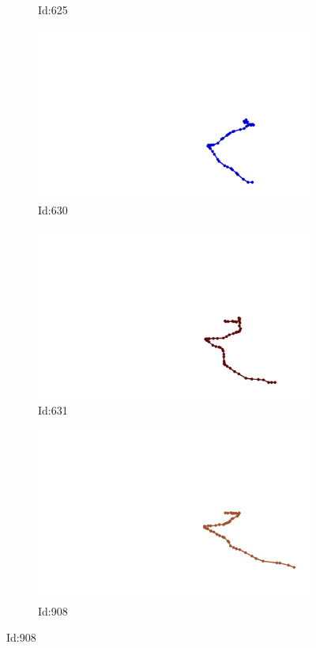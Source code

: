\documentclass[12pt,twoside]{report}
\begin{document}
\begin{figure}
\begin{subfigure}[b]{0.20\textwidth}
\caption{Id:625}
\end{subfigure}
\begin{subfigure}[b]{0.20\textwidth}
\centering
\includegraphics[width=\textwidth]{../../trajectories/630.png}
\caption{Id:630}
\end{subfigure}
\begin{subfigure}[b]{0.20\textwidth}
\centering
\includegraphics[width=\textwidth]{../../trajectories/631.png}
\caption{Id:631}
\end{subfigure}
\begin{subfigure}[b]{0.20\textwidth}
\centering
\includegraphics[width=\textwidth]{../../trajectories/908.png}
\caption{Id:908}
\end{subfigure}
\end{figure}
\end{document}

